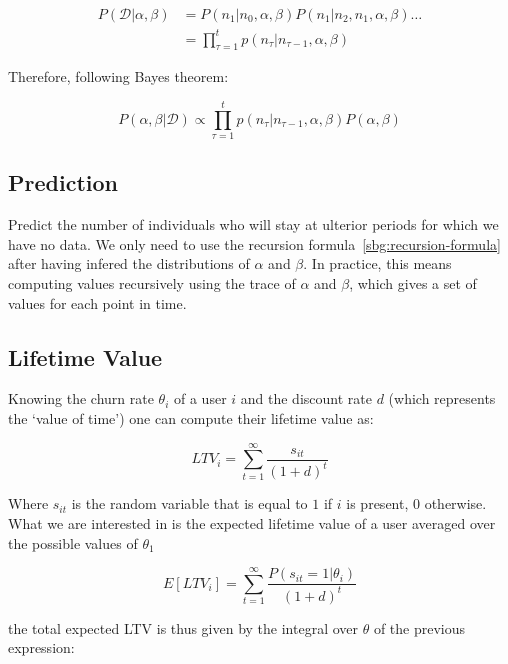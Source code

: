 \documentclass{tufte-book}
\begin{document}
\begin{align*}
  P(\mathcal{D} | \alpha, \beta) &= P(n_1|n_0, \alpha, \beta) P(n_1|n_2, n_1, \alpha, \beta) \dots\\
      &= \prod_{\tau=1}^t p(n_\tau|n_{\tau-1}, \alpha, \beta)
\end{align*}

Therefore, following Bayes theorem:

\begin{equation}
  P(\alpha, \beta | \mathcal{D}) \propto \prod_{\tau=1}^t p(n_\tau|n_{\tau-1}, \alpha, \beta) P(\alpha, \beta)
\end{equation}

  \subsection{Prediction}%
  \label{sub:prediction}

Predict the number of individuals who will stay at ulterior periods for which we have no data. We only need to
use the recursion formula~\ref{sbg:recursion-formula} after having infered the distributions of $\alpha$ and
$\beta$. In practice, this means computing values recursively using the trace of $\alpha$ and $\beta$, which
gives a set of values for each point in time.

  
  \subsection{Lifetime Value}%
  \label{sub:lifetime_value}
  
Knowing the churn rate $\theta_i$ of a user $i$ and the discount rate $d$ (which represents the `value of
time')  one can compute their lifetime value as:

\begin{equation}
  LTV_i = \sum_{t=1}^\infty \frac{s_{it}}{\left(1+d\right)^t}
\end{equation}

Where $s_{it}$ is the random variable that is equal to $1$ if $i$ is present, $0$ otherwise. What we are interested in is the expected lifetime value of a user averaged over the possible values of
$\theta_1$

\begin{equation}
  E\left[LTV_i\right] = \sum_{t=1}^\infty \frac{P(s_{it}=1|\theta_i)}{(1+d)^t}
\end{equation}

the total expected LTV is thus given by the integral over $\theta$ of the previous expression:
\end{document}
